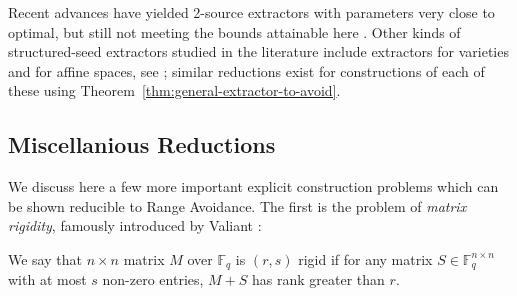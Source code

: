 Recent advances have yielded 2-source extractors with parameters very close to optimal, but still not meeting the bounds attainable here \cite{li-extractor,extractors-survey}. Other kinds of structured-seed extractors studied in the literature include extractors for varieties and for affine spaces, see \cite{varieties,affine}; similar reductions exist for constructions of each of these using Theorem~\ref{thm:general-extractor-to-avoid}.
\subsection{Miscellanious Reductions}\label{range:subsec:miscellaneous-reductions}
We discuss here a few more important explicit construction problems which can be shown reducible to Range Avoidance. The first is the problem of \emph{matrix rigidity}, famously introduced by Valiant \cite{Valiant}:

\begin{definition}\cite{Valiant}\label{range:def:matrix-rigidity}
We say that $n \times n$ matrix $M$ over $\mathbb{F}_q$ is $(r, s)$ rigid if for any matrix $S \in \mathbb{F}_q^{n \times n}$ with at most $s$ non-zero entries, $M+S$ has rank greater than $r$.
\end{definition}

